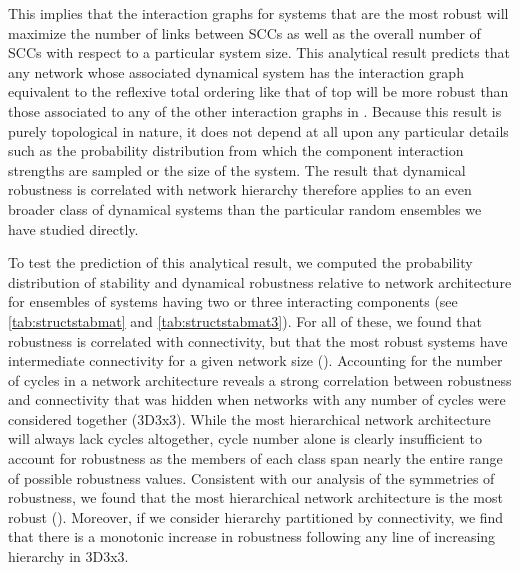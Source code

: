 This implies that the interaction graphs for systems that are the most robust will maximize the number of links between SCCs as well as the overall number of SCCs with respect to a particular system size. This analytical result predicts that any network whose associated dynamical system has the interaction graph equivalent to the reflexive total ordering like that of  top will be more robust than those associated to any of the other interaction graphs in . Because this result is purely topological in nature, it does not depend at all upon any particular details such as the probability distribution from which the component interaction strengths are sampled or the size of the system. The result that dynamical robustness is correlated with network hierarchy therefore applies to an even broader class of dynamical systems than the particular random ensembles we have studied directly.

To test the prediction of this analytical result, we computed the probability distribution of stability and dynamical robustness relative to network architecture for ensembles of systems having two or three interacting components (see \ref{tab:structstabmat} and \ref{tab:structstabmat3}). For all of these, we found that robustness is correlated with connectivity, but that the most robust systems have intermediate connectivity for a given network size (). Accounting for the number of cycles in a network architecture reveals a strong correlation between robustness and connectivity that was hidden when networks with any number of cycles were considered together (3D3x3). While the most hierarchical network architecture will always lack cycles altogether, cycle number alone is clearly insufficient to account for robustness as the members of each class span nearly the entire range of possible robustness values. Consistent with our analysis of the symmetries of robustness, we found that the most hierarchical network architecture is the most robust (). Moreover, if we consider hierarchy partitioned by connectivity, we find that there is a monotonic increase in robustness following any line of increasing hierarchy in 3D3x3.
